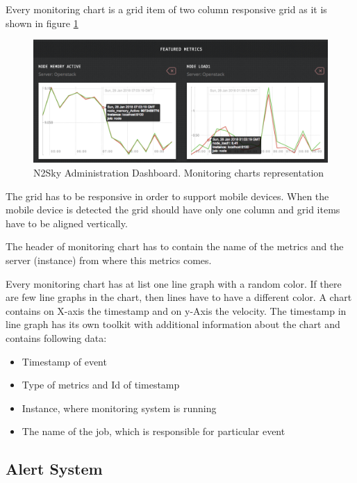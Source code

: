 Every monitoring chart is a grid item of two column responsive grid as it is shown in figure \ref{fig:moniroting_representation}

\begin{figure}[htbp]
\begin{center}
  \includegraphics[width=\linewidth]{components/4/pics/moniroting_representation.png}
  \caption{N2Sky Administration Dashboard. Monitoring charts representation}
  \label{fig:moniroting_representation}
\end{center}
\end{figure}

The grid has to be responsive in order to support mobile devices. When the mobile device is detected the grid should have only one column and grid items have to be aligned vertically. 

The header of monitoring chart has to contain the name of the metrics and the server (instance) from where this metrics comes.

Every monitoring chart has at list one line graph with a random color. If there are few line graphs in the chart, then lines have to have a different color. A chart contains on X-axis the timestamp and on y-Axis the velocity.  The timestamp in line graph has its own toolkit with additional information about the chart and contains following data:

\begin{itemize}
\item Timestamp of event
\item Type of metrics and Id of timestamp
\item Instance, where monitoring system is running
\item The name of the job, which is responsible for particular event
\end{itemize}


\subsection{Alert System}\label{Alerting System}

